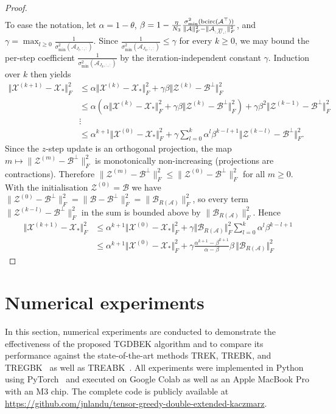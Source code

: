 \documentclass[11pt]{article}
\def\fm#1{\mathcal{#1}}
\def \a#1{\fm A_{:, #1, :}}
\def \ai#1{\fm A_{#1, :, :}}
\def \x#1{\fm X^{(#1)}}
\begin{document}
\begin{proof}
\begin{align*}
\end{align*}
To ease the notation, let $\alpha = 1 - \theta$, $\beta = 1 - \frac{\eta}{N_3}  \frac{\sigma_{\min}^2(\bcirc(\fm A^\top))}{\Vert \fm A \Vert_F^2 - \Vert \a{\overline{U}} \Vert_F^2}  $, and $\gamma = \max_{l \geq 0}\frac{1}{\sigma_{\min}^2(\ai{J_l})}$.
Since $\frac{1}{\sigma_{\min}^2(\ai{J_k})}\leq\gamma$ for every $k\geq 0$, we may bound the per-step coefficient $\frac{1}{\sigma_{\min}^2(\ai{J_k})}$ by the iteration-independent constant $\gamma$. Induction over $k$ then yields
\begin{align*}
    \Vert \x{k+1} - \fm X_\ast \Vert_F^2  & \leq \alpha  \Vert \x k - \fm X_\ast \Vert_F^2 + \gamma\beta \Vert \fm Z^{(k)} - \fm B^\perp \Vert_F^2\\
    & \leq \alpha \left( \alpha  \Vert \x k - \fm X_\ast \Vert_F^2 + \gamma\beta \Vert \fm Z^{(k)} - \fm B^\perp \Vert_F^2 \right) + \gamma\beta^2 \Vert \fm Z^{(k-1)} - \fm B^\perp \Vert_F^2\\
    &\vdots\\
    & \leq \alpha^{k+1} \Vert \x 0 - \fm X_\ast \Vert_F^2  + \gamma\sum_{l=0}^k \alpha^{l} \beta^{k-l+1}  \Vert \fm Z^{(k-l)} - \fm B^\perp \Vert_F^2.
\end{align*}
Since the $z$-step update is an orthogonal projection, the map
$m\mapsto\|\fm Z^{(m)}-\fm B^\perp\|_F^2$ is monotonically non-increasing
(projections are contractions).
Therefore $\|\fm Z^{(m)}-\fm B^\perp\|_F^2\leq\|\fm Z^{(0)}-\fm B^\perp\|_F^2$
for all $m\geq 0$.
With the initialisation $\fm Z^{(0)}=\fm B$ we have
$\|\fm Z^{(0)}-\fm B^\perp\|_F^2=\|\fm B-\fm B^\perp\|_F^2=\|\fm B_{R(\fm A)}\|_F^2$,
so every term $\|\fm Z^{(k-l)}-\fm B^\perp\|_F^2$ in the sum is bounded above by
$\|\fm B_{R(\fm A)}\|_F^2$.
Hence
\begin{align*}
    \Vert \x{k+1} - \fm X_\ast \Vert_F^2
    &\leq \alpha^{k+1} \Vert \x 0 - \fm X_\ast \Vert_F^2  + \gamma\Vert \fm B_{R(\fm A)}\Vert_F^2 \sum_{l=0}^k \alpha^{l} \beta^{k-l+1}\\
    &\leq \alpha^{k+1} \Vert \x 0 - \fm X_\ast \Vert_F^2 + \gamma\frac{\alpha^{k+1} -\beta^{k+1}}{\alpha - \beta} \beta\,\Vert \fm B_{R(\fm A)}\Vert_F^2
\end{align*}
\end{proof}


\section{Numerical experiments} \label{sec:numexp}
In this section, numerical experiments are conducted to demonstrate the effectiveness of the proposed TGDBEK algorithm and to compare its performance against the state-of-the-art methods TREK, TREBK, and TREGBK~\cite{huang2023TREK} as well as TREABK~\cite{su2025}. All experiments were implemented in Python using PyTorch~\cite{ansel2025pytorch} and executed on Google Colab as well as an Apple MacBook Pro with an M3 chip. The complete code is publicly available at \url{https://github.com/jnlandu/tensor-greedy-double-extended-kaczmarz}.
\end{document}
